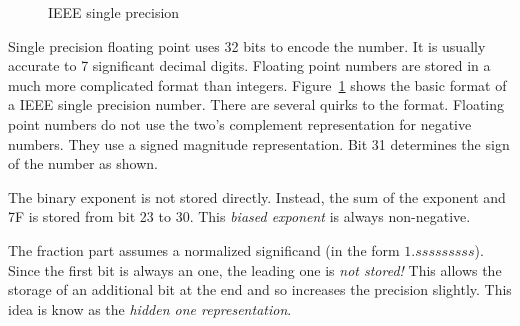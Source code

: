 \begin{figure}[t]
\caption{IEEE single precision\label{fig:IEEEsingle}}
\end{figure}

Single precision floating point uses 32 bits to encode the number. It is
usually accurate to 7 significant decimal digits. Floating point num\-bers are
stored in a much more complicated format than integers. 
Figure~\ref{fig:IEEEsingle} shows the basic format of a IEEE single precision
number. There are several quirks to the format. Floating point numbers do
not use the two's complement representation for negative numbers. They use
a signed magnitude representation. Bit 31 determines the sign of the number
as shown.

The binary exponent is not stored directly. Instead, the sum of the
exponent and 7F is stored from bit 23 to 30. This
\emph{biased exponent} is always non-negative.

The fraction part assumes a normalized significand (in the form 
$1.sssssssss$). Since the first bit is always an one, the leading one is
\emph{not stored!} This allows the storage of an additional bit at the end
and so increases the precision slightly. This idea is know as the
\emph{hidden one representation}.

